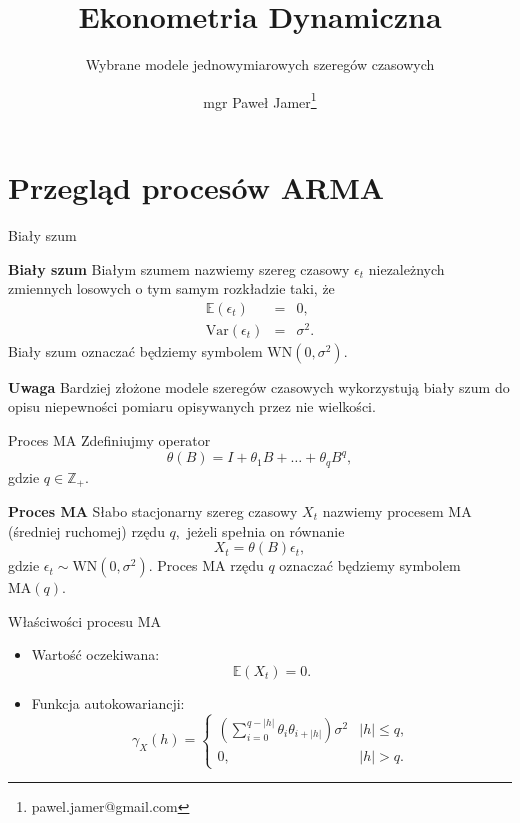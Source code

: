\documentclass[a4paper, 11pt]{beamer}
\title{Ekonometria Dynamiczna}
\subtitle{Wybrane modele jednowymiarowych szeregów czasowych}
\author{mgr Paweł Jamer\thanks{pawel.jamer@gmail.com}}
\begin{document}
	\begin{frame}
		\titlepage
	\end{frame}
	
	\section{Przegląd procesów ARMA}

	\begin{frame}{Biały szum}
		\begin{block}{\textbf{Biały szum}}
			Białym szumem nazwiemy szereg czasowy $\epsilon_t$ niezależnych zmiennych losowych o tym samym rozkładzie taki, że \begin{eqnarray*}
				\mathbb{E}\left(\epsilon_t\right) & = & 0,\\
				\mbox{Var}\left(\epsilon_t\right) & = & \sigma^2.
			\end{eqnarray*} Biały szum oznaczać będziemy symbolem $\mbox{WN}\left(0, \sigma^2\right)$.
		\end{block}
		\begin{alert}{\textbf{Uwaga}}
			Bardziej złożone modele szeregów czasowych wykorzystują biały szum do opisu niepewności pomiaru opisywanych przez nie wielkości.
		\end{alert}
	\end{frame}

	\begin{frame}{Proces MA}
		Zdefiniujmy operator \[
			\theta\left(B\right) = I + \theta_{1} B + \ldots +\theta_{q} B^{q},
		\] gdzie $q \in \mathbb{Z}_{+}.$
		\begin{block}{\textbf{Proces MA}}
			Słabo stacjonarny szereg czasowy $X_t$ nazwiemy procesem MA (średniej ruchomej) rzędu $q,$ jeżeli spełnia on równanie \[
				X_t = \theta\left(B\right) \epsilon_{t},
			\] gdzie $\epsilon_{t} \sim \mbox{WN}\left(0, \sigma^2\right).$ Proces MA rzędu $q$ oznaczać będziemy symbolem $\mbox{MA}\left(q\right)$.
		\end{block}
	\end{frame}
	
	\begin{frame}{Właściwości procesu MA}
		\begin{itemize}
			\item Wartość oczekiwana: \[
				\mathbb{E}\left(X_{t}\right) = 0.
			\]
			\item Funkcja autokowariancji: \[
				\gamma_{X}\left(h\right) = \begin{cases}
					\left(\sum_{i=0}^{q-\left|h\right|}\theta_{i}\theta_{i+\left|h\right|}\right)\sigma^{2} & \left|h\right|\leq q,\\
					0, & \left|h\right|>q.
				\end{cases}
			\]
		\end{itemize}
	\end{frame}
\end{document}
